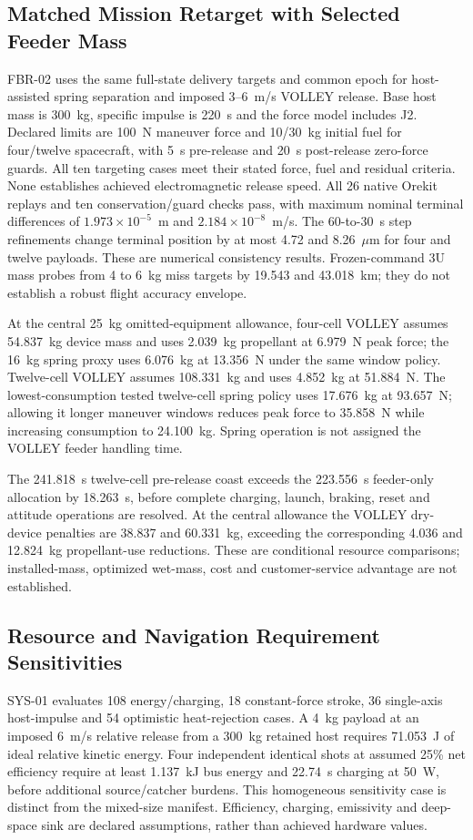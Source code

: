 \documentclass[conference]{IEEEtran}
\begin{document}
\subsection{Matched Mission Retarget with Selected Feeder Mass}
FBR-02 uses the same full-state delivery targets and common epoch for host-assisted spring separation and imposed 3--6~m/s VOLLEY release. Base host mass is 300~kg, specific impulse is 220~s and the force model includes J2. Declared limits are 100~N maneuver force and 10/30~kg initial fuel for four/twelve spacecraft, with 5~s pre-release and 20~s post-release zero-force guards. All ten targeting cases meet their stated force, fuel and residual criteria. None establishes achieved electromagnetic release speed. All 26 native Orekit replays and ten conservation/guard checks pass, with maximum nominal terminal differences of $1.973\times10^{-5}$~m and $2.184\times10^{-8}$~m/s. The 60-to-30~s step refinements change terminal position by at most 4.72 and 8.26~$\mu$m for four and twelve payloads. These are numerical consistency results. Frozen-command 3U mass probes from 4 to 6~kg miss targets by 19.543 and 43.018~km; they do not establish a robust flight accuracy envelope.

At the central 25~kg omitted-equipment allowance, four-cell VOLLEY assumes 54.837~kg device mass and uses 2.039~kg propellant at 6.979~N peak force; the 16~kg spring proxy uses 6.076~kg at 13.356~N under the same window policy. Twelve-cell VOLLEY assumes 108.331~kg and uses 4.852~kg at 51.884~N. The lowest-consumption tested twelve-cell spring policy uses 17.676~kg at 93.657~N; allowing it longer maneuver windows reduces peak force to 35.858~N while increasing consumption to 24.100~kg. Spring operation is not assigned the VOLLEY feeder handling time.

The 241.818~s twelve-cell pre-release coast exceeds the 223.556~s feeder-only allocation by 18.263~s, before complete charging, launch, braking, reset and attitude operations are resolved. At the central allowance the VOLLEY dry-device penalties are 38.837 and 60.331~kg, exceeding the corresponding 4.036 and 12.824~kg propellant-use reductions. These are conditional resource comparisons; installed-mass, optimized wet-mass, cost and customer-service advantage are not established.

\subsection{Resource and Navigation Requirement Sensitivities}
SYS-01 evaluates 108 energy/charging, 18 constant-force stroke, 36 single-axis host-impulse and 54 optimistic heat-rejection cases. A 4~kg payload at an imposed 6~m/s relative release from a 300~kg retained host requires 71.053~J of ideal relative kinetic energy. Four independent identical shots at assumed 25\% net efficiency require at least 1.137~kJ bus energy and 22.74~s charging at 50~W, before additional source/catcher burdens. This homogeneous sensitivity case is distinct from the mixed-size manifest. Efficiency, charging, emissivity and deep-space sink are declared assumptions, rather than achieved hardware values.
\end{document}
